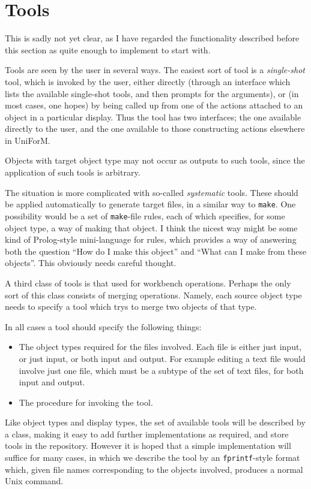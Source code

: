 \documentclass[a4paper]{article}
\begin{document}
\section{Tools}
This is sadly not yet clear, as I have regarded the functionality described
before this section as quite enough to implement to start with.
\par
Tools are seen by the user in several ways.  The easiest sort of tool
is a {\em single-shot} tool, which is invoked by the user, either directly
(through an interface which lists the available single-shot tools,
and then prompts for the arguments), or (in most cases, one hopes) by being 
called up from one of the actions attached to an object in a particular 
display.  Thus the tool has two interfaces; the one available directly
to the user, and the one available to those constructing actions elsewhere
in UniForM. 
\par
Objects with target object type may not occur
as outputs to such tools, since the application of such tools is
arbitrary.
\par
The situation is more complicated with so-called {\em systematic}
tools.  These should be applied automatically to generate target
files, in a similar way to \texttt{make}.  One possibility would
be a set of \texttt{make}-file rules, each of which specifies, for
some object type, a way of making that object.  I think the nicest way
might be some kind of Prolog-style mini-language for rules, which provides
a way of answering both the question ``How do I make this object'' and
``What can I make from these objects''.  This obviously needs careful
thought.
\par
A third class of tools is that used for workbench operations.
Perhaps the only sort of this class consists of merging operations.
Namely, each source object type needs to specify a tool which trys to
merge two objects of that type. 
\par
In all cases a tool should specify the following things:
\begin{itemize}
\item The object types required for the files involved.  Each file
      is either just input, or just input, or both input and output.
      For example editing a text file would involve just one file,
      which must be a subtype of the set of text files, for both
      input and output.
\item The procedure for invoking the tool.
\end{itemize}
Like object types and display types, the set of available tools will be
described by a class, making it easy to add further implementations as
required, and store tools in the repository.  However it is hoped that
a simple implementation will suffice for many cases, in which we describe
the tool by an \texttt{fprintf}-style format which, given file names 
corresponding to the objects involved, produces a normal Unix command.
\end{document}
